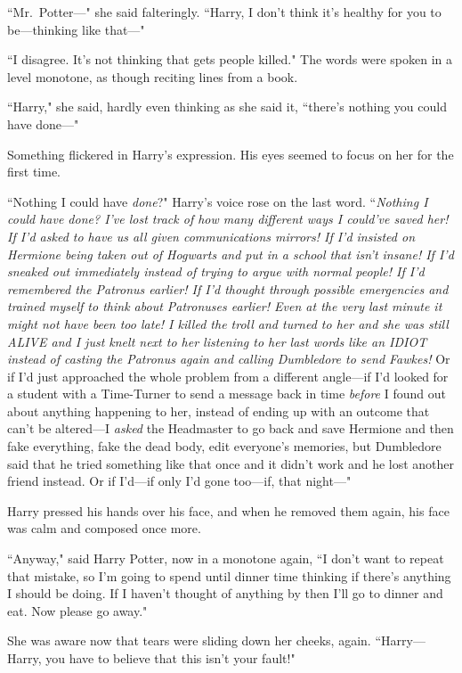 ``Mr.~Potter---" she said falteringly. ``Harry, I don't think it's healthy for you to be---thinking like that---"

``I disagree. It's not thinking that gets people killed." The words were spoken in a level monotone, as though reciting lines from a book.

``Harry," she said, hardly even thinking as she said it, ``there's nothing you could have done---"

Something flickered in Harry's expression. His eyes seemed to focus on her for the first time.

``Nothing I could have \emph{done}?" Harry's voice rose on the last word. ``\emph{Nothing I could have \emph{done}? I've lost track of how many different ways I could've saved her! If I'd asked to have us all given communications mirrors! If I'd insisted on Hermione being taken out of Hogwarts and put in a school that isn't insane! If I'd sneaked out immediately instead of trying to argue with normal people! If I'd remembered the Patronus earlier! If I'd thought through possible emergencies and trained myself to think about Patronuses earlier! Even at the very last minute it might not have been too late! I killed the troll and turned to her and she was still ALIVE and I just knelt next to her listening to her last words like an IDIOT instead of casting the Patronus again and calling Dumbledore to send Fawkes!} Or if I'd just approached the whole problem from a different angle---if I'd looked for a student with a Time-Turner to send a message back in time \emph{before} I found out about anything happening to her, instead of ending up with an outcome that can't be altered---I \emph{asked} the Headmaster to go back and save Hermione and then fake everything, fake the dead body, edit everyone's memories, but Dumbledore said that he tried something like that once and it didn't work and he lost another friend instead. Or if I'd---if only I'd gone too---if, that night---"

Harry pressed his hands over his face, and when he removed them again, his face was calm and composed once more.

``Anyway," said Harry Potter, now in a monotone again, ``I don't want to repeat that mistake, so I'm going to spend until dinner time thinking if there's anything I should be doing. If I haven't thought of anything by then I'll go to dinner and eat. Now please go away."

She was aware now that tears were sliding down her cheeks, again. ``Harry---Harry, you have to believe that this isn't your fault!"

